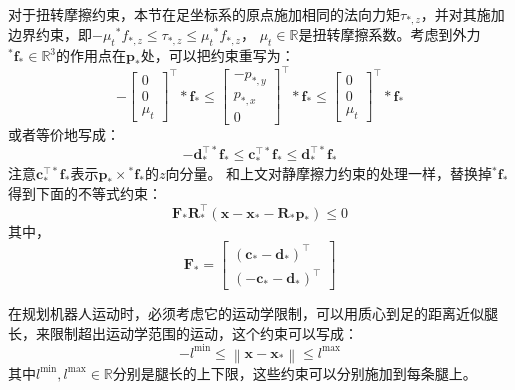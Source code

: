 对于扭转摩擦约束，本节在足坐标系的原点施加相同的法向力矩$\tau_{*, z}$，并对其施加边界约束，即$-\mu_t{ }^* f_{*, z} \leq \tau_{*, z} \leq \mu_t{ }^* f_{*, z}$，
$\mu_t \in \mathbb{R}$是扭转摩擦系数。考虑到外力${ }^* \boldsymbol{f}_* \in \mathbb{R}^{3}$的作用点在$\boldsymbol{p}_*$处，可以把约束重写为：
\begin{equation}
    \label{equ:friction_final}
    -\left[\begin{array}{c}
        0 \\
        0 \\
        \mu_t
        \end{array}\right]^{\top} * \boldsymbol{f}_* \leq\left[\begin{array}{c}
        -p_{*, y} \\
        p_{*, x} \\
        0
        \end{array}\right]^{\top} * \boldsymbol{f}_* \leq\left[\begin{array}{c}
        0 \\
        0 \\
        \mu_t
        \end{array}\right]^{\top} * \boldsymbol{f}_*
\end{equation}
或者等价地写成：
\begin{equation}
    \label{equ:friction_vector}
    -\boldsymbol{d}_*^{\top *} \boldsymbol{f}_* \leq \boldsymbol{c}_*^{\top *} \boldsymbol{f}_* \leq \boldsymbol{d}_*^{\top *} \boldsymbol{f}_*
\end{equation}
注意$\boldsymbol{c}_*^{\top *} \boldsymbol{f}_*$表示$\boldsymbol{p}_* \times { }^* \boldsymbol{f}_*$的$z$向分量。
和上文对静摩擦力约束的处理一样，替换掉${ }^* \boldsymbol{f}_*$得到下面的不等式约束：
\begin{equation}
    \label{equ:friction_stack}
    \boldsymbol{F}_* \boldsymbol{R}_*^{\top}\left(\boldsymbol{x}-\boldsymbol{x}_*-\boldsymbol{R}_* \boldsymbol{p}_*\right) \leq 0
\end{equation}
其中，
\begin{equation}
    \label{equ:friction_F}
    \boldsymbol{F}_*=\left[\begin{array}{c}
        \left(\boldsymbol{c}_*-\boldsymbol{d}_*\right)^{\top} \\
        \left(-\boldsymbol{c}_*-\boldsymbol{d}_*\right)^{\top}
        \end{array}\right]
\end{equation}

在规划机器人运动时，必须考虑它的运动学限制，可以用质心到足的距离近似腿长，来限制超出运动学范围的运动，这个约束可以写成：
\begin{equation}
    \label{equ:kine_constraint}
    -l^{\min } \leq\left\|\boldsymbol{x}-\boldsymbol{x}_*\right\| \leq l^{\max }
\end{equation}
其中$l^{\min}, l^{\max} \in \mathbb{R}$分别是腿长的上下限，这些约束可以分别施加到每条腿上。
